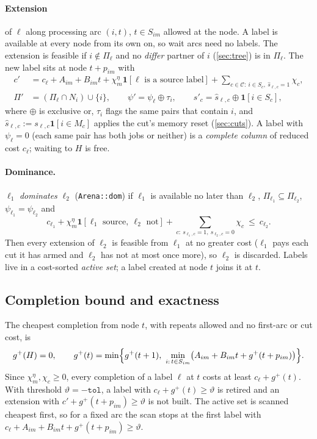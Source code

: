 \documentclass[11pt,a4paper]{article}
\theoremstyle{definition}
\theoremstyle{remark}
\newcommand{\Cuts}{\mathcal{C}}
\newcommand{\code}[1]{\texttt{#1}}
\newcommand{\ind}[1]{\mathbf{1}[#1]}
\begin{document}
\paragraph{Extension} of $\ell$ along processing arc $(i,t)$, $t\in S_{im}$
allowed at the node. A label is available at every node from its own on, so
wait arcs need no labels. The extension is feasible if $i\notin\Pi_\ell$ and no
\emph{differ} partner of $i$ (\cref{sec:tree}) is in $\Pi_\ell$. The new label
sits at node $t+p_{im}$ with
\begin{align*}
c'&=c_\ell+A_{im}+B_{im}t+\chi^\eta_m\ind{\ell\text{ is a source label}}
   +\sum_{c\in\Cuts:\ i\in S_c,\ \hat s_{\ell,c}=1}\chi_c,\\
\Pi'&=(\Pi_\ell\cap N_i)\cup\{i\},\qquad
\psi'=\psi_\ell\oplus\tau_i,\qquad
s'_c=\hat s_{\ell,c}\oplus\ind{i\in S_c},
\end{align*}
where $\oplus$ is exclusive or, $\tau_i$ flags the same pairs that contain $i$,
and $\hat s_{\ell,c}:=s_{\ell,c}\ind{i\in M_c}$ applies the cut's memory reset
(\cref{sec:cuts}). A label with $\psi_\ell=0$ (each same pair has both jobs or
neither) is a \emph{complete column} of reduced cost $c_\ell$; waiting to $H$
is free.

\paragraph{Dominance.} $\ell_1$ \emph{dominates} $\ell_2$ (\code{Arena::dom})
if $\ell_1$ is available no later than $\ell_2$,
$\Pi_{\ell_1}\subseteq\Pi_{\ell_2}$, $\psi_{\ell_1}=\psi_{\ell_2}$ and
\[
c_{\ell_1}+\chi^\eta_m\ind{\ell_1\text{ source},\ \ell_2\text{ not}}
+\sum_{c:\ s_{\ell_1,c}=1,\ s_{\ell_2,c}=0}\chi_c\ \le\ c_{\ell_2}.
\]
Then every extension of $\ell_2$ is feasible from $\ell_1$ at no greater cost
($\ell_1$ pays each cut it has armed and $\ell_2$ has not at most once more),
so $\ell_2$ is discarded. Labels live in a cost-sorted \emph{active set}; a
label created at node $t$ joins it at $t$.

\subsection{Completion bound and exactness}
The cheapest completion from node $t$, with repeats allowed and no first-arc or
cut cost, is
\begin{equation}\label{eq:g}
g^+(H)=0,\qquad g^+(t)=\min\Bigl\{g^+(t+1),\ \min_{i:\,t\in S_{im}}\bigl(A_{im}+B_{im}t+g^+(t+p_{im})\bigr)\Bigr\}.
\end{equation}
Since $\chi^\eta_m,\chi_c\ge0$, every completion of a label $\ell$ at $t$ costs
at least $c_\ell+g^+(t)$. With threshold $\vartheta=-\texttt{tol}$, a label
with $c_\ell+g^+(t)\ge\vartheta$ is retired and an extension with
$c'+g^+(t+p_{im})\ge\vartheta$ is not built. The active set is scanned
cheapest first, so for a fixed arc the scan stops at the first label with
$c_\ell+A_{im}+B_{im}t+g^+(t+p_{im})\ge\vartheta$.
\end{document}
